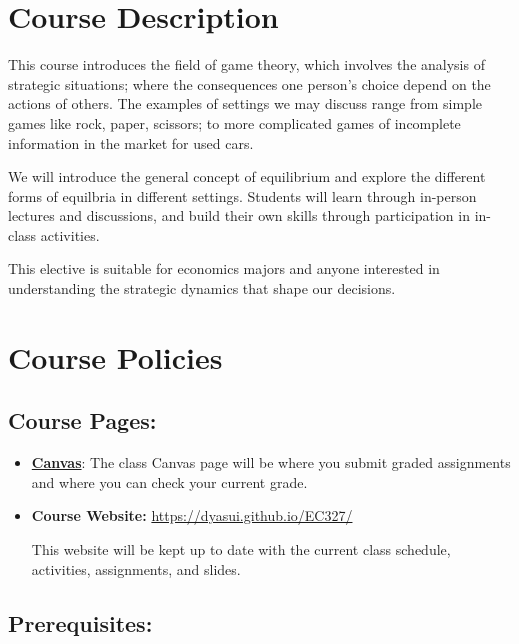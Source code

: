 \section*{Course Description}

This course introduces the field of game theory, which involves the analysis of strategic situations;
where the consequences one person's choice depend on the actions of others.
The examples of settings we may discuss range from simple games like rock, paper, scissors; 
to more complicated games of incomplete information in the market for used cars. 

We will introduce the general concept of equilibrium and explore the different forms of equilbria 
in different settings.
Students will learn through in-person lectures and discussions,
and build their own skills through participation in in-class activities.

This elective is suitable for economics majors and anyone interested in understanding the strategic dynamics that shape our decisions.

\section{Course Policies}

\subsection{Course Pages:}

\begin{itemize}

\item \href{https://canvas.uoregon.edu/courses/274671}{\textbf{Canvas}}:
  The class Canvas page will be where you submit graded assignments and where you can check your current grade.

\item \textbf{Course Website:} \url{https://dyasui.github.io/EC327/}

  This website will be kept up to date with the current class schedule, activities, assignments, and slides.

\end{itemize}

\subsection{Prerequisites:}

